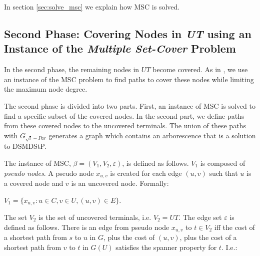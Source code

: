   In section \ref{sec:solve_msc} we explain how MSC is solved.

\subsection{Second Phase: Covering Nodes in \emph{UT} using an Instance of the \emph{Multiple Set-Cover} Problem}
\label{sec:second-phase}

In the second phase, the remaining nodes in $UT$ become covered. As in \cite{Elkin2006}, we use an instance of the MSC problem
to find paths to cover these nodes while limiting the maximum node degree. 

The second phase is divided into two parts. First,
an instance of MSC is solved to find a specific subset of the covered nodes. In the second
part, we define paths from these covered nodes to the uncovered terminals. 
The union of these paths with $G_{\sqrt{l}-Par}$ generates a graph which contains an arborescence that is a solution
to DSMDStP. 


The instance of MSC, $\beta=(V_1, V_2, \varepsilon)$, is defined as follows. $V_1$ is composed of \emph{pseudo nodes}. A pseudo node $x_{u, v}$ is created
for each edge $(u, v)$ such that $u$ is a covered node and $v$ is an uncovered node. Formally:
\begin{center}
$V_1 = \lbrace x_{u,v} : u \in C, v \in U, (u,v) \in E \rbrace$.
\end{center}

The set $V_2$ is the set of uncovered terminals, i.e. \mbox{$V_2 = UT$}. The edge set $\varepsilon$ is defined as follows. There is an edge from
pseudo node $x_{u,v}$ to $t \in V_2$ iff the cost of a shortest path from $s$ to $u$ in $G$, plus the cost of $(u, v)$, plus the cost of a shortest path from
$v$ to $t$ in $G(U)$ satisfies the spanner property for $t$. I.e.: 

